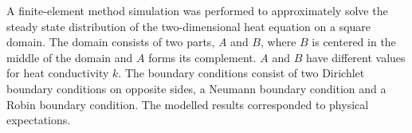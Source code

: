 A finite-element method simulation was performed to approximately solve the steady state distribution of the  two-dimensional heat equation on a square domain. The domain consists of two parts, $A$ and $B$, where $B$ is centered in the middle of the domain and $A$ forms its complement. $A$ and $B$ have different values for heat conductivity $k$. The boundary conditions consist of two Dirichlet boundary conditions on opposite sides, a Neumann boundary condition and a Robin boundary condition. The modelled results corresponded to physical expectations.